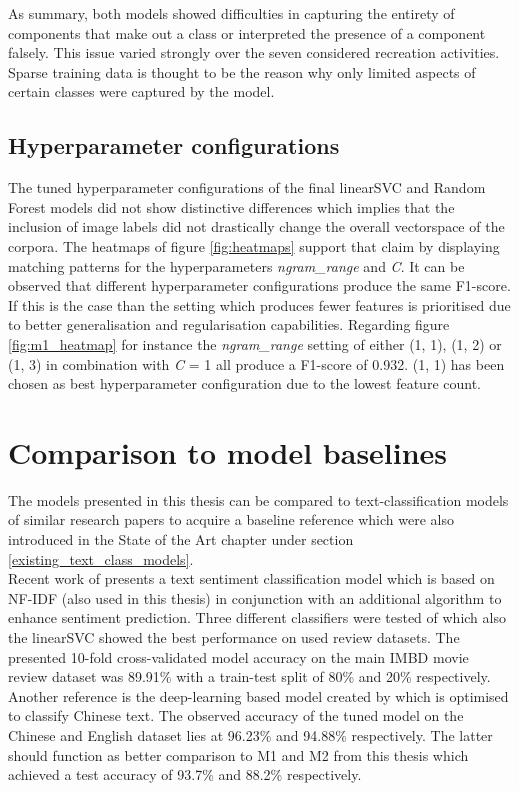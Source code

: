 As summary, both models showed difficulties in capturing the entirety of components that make out a class or interpreted the presence of a component falsely. This issue varied strongly over the seven considered recreation activities. Sparse training data is thought to be the reason why only limited aspects of certain classes were captured by the model.

\subsection{Hyperparameter configurations}
The tuned hyperparameter configurations of the final linearSVC and Random Forest models did not show distinctive differences which implies that the inclusion of image labels did not drastically change the overall vectorspace of the corpora. The heatmaps of figure \ref{fig:heatmaps} support that claim by displaying matching patterns for the hyperparameters \textit{ngram\_range} and \textit{C}. It can be observed that different hyperparameter configurations produce the same F1-score. If this is the case than the setting which produces fewer features is prioritised due to better generalisation and regularisation capabilities. Regarding figure \ref{fig:m1_heatmap} for instance the \textit{ngram\_range} setting of either (1, 1), (1, 2) or (1, 3) in combination with \textit{C} = 1 all produce a F1-score of 0.932. (1, 1) has been chosen as best hyperparameter configuration due to the lowest feature count.

\section{Comparison to model baselines} \label{model_baseline}
The models presented in this thesis can be compared to text-classification models of similar research papers to acquire a baseline reference which were also introduced in the State of the Art chapter under section \ref{existing_text_class_models}. \\
Recent work of \textcite{Das2018} presents a text sentiment classification model which is based on NF-IDF (also used in this thesis) in conjunction with an additional algorithm to enhance sentiment prediction. Three different classifiers were tested of which also the linearSVC showed the best performance on used review datasets. The presented 10-fold cross-validated model accuracy on the main IMBD movie review dataset was 89.91\% with a train-test split of 80\% and 20\% respectively.\\
Another reference is the deep-learning based model created by \textcite{Li2018} which is optimised to classify Chinese text. The observed accuracy of the tuned model on the Chinese and English dataset lies at 96.23\% and 94.88\% respectively. The latter should function as better comparison to M1 and M2 from this thesis which achieved a test accuracy of 93.7\% and 88.2\% respectively.

